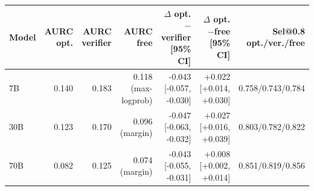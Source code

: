 \begin{tabular}{lrrrrrr}
\toprule
Model & AURC opt. & AURC verifier & AURC free & $\Delta$ opt.$-$verifier [95\% CI] & $\Delta$ opt.$-$free [95\% CI] & Sel@0.8 opt./ver./free \\
\midrule
7B & 0.140 & 0.183 & 0.118 (max-logprob) & -0.043 [-0.057, -0.030] & +0.022 [+0.014, +0.030] & 0.758/0.743/0.784 \\
30B & 0.123 & 0.170 & 0.096 (margin) & -0.047 [-0.063, -0.032] & +0.027 [+0.016, +0.039] & 0.803/0.782/0.822 \\
70B & 0.082 & 0.125 & 0.074 (margin) & -0.043 [-0.055, -0.031] & +0.008 [+0.002, +0.014] & 0.851/0.819/0.856 \\
\bottomrule
\end{tabular}
